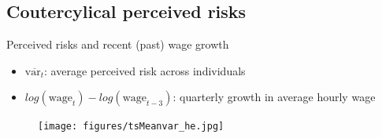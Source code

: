 \documentclass{beamer}
\begin{document}
\subsection{Coutercylical perceived risks}

\begin{frame}{Perceived risks and recent (past) wage growth}
	\begin{itemize}
		\item $\overline{\text{var}_{t}} $: average perceived risk across individuals
		\item  $log(\text{wage}_t) - log(\text{wage}_{t-3})$: quarterly growth in average hourly wage
	\end{itemize}
	\begin{figure}
		\centering
		\label{ts_var}
		\texttt{[image: figures/tsMeanvar\_he.jpg]}
	\end{figure}
\end{frame}


\end{document}
